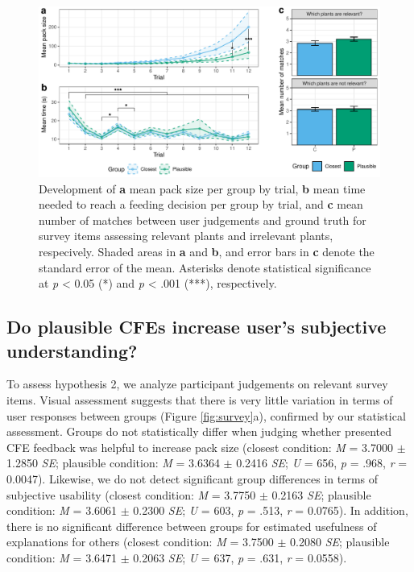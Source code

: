{\begin{figure}
   \centering
   \includegraphics[width=\textwidth]{./media/H1_p_ShubsPerTrial_RTPertrial_PAZ_FINAL.pdf}
   \caption{Development of \textbf{a} mean pack size per group by trial, \textbf{b} mean time needed to reach a feeding decision per group by trial, and \textbf{c} mean number of matches between user judgements and ground truth for survey items assessing relevant plants and irrelevant plants, respecively. Shaded areas in \textbf{a} and \textbf{b}, and error bars in \textbf{c} denote the standard error of the mean. Asterisks denote statistical significance at \textit{p} < 0.05 (*) and \textit{p} < .001 (***), respectively.}
   \label{fig:hyp1}
 \end{figure}

\subsection{Do plausible CFEs increase user's subjective understanding?}
To assess hypothesis 2, we analyze participant judgements on relevant survey items.
Visual assessment suggests that there is very little variation in terms of user responses between groups (Figure \ref{fig:survey}a), confirmed by our statistical assessment. 
Groups do not statistically differ when judging whether presented \gls{CFE} feedback was helpful to increase pack size (closest condition: \textit{M} = 3.7000 $\pm$ 1.2850 \textit{SE}; plausible condition: \textit{M} = 3.6364 $\pm$ 0.2416 \textit{SE}; \textit{U} = 656, \textit{p} = .968, \textit{r} = 0.0047).
Likewise, we do not detect significant group differences in terms of subjective usability (closest condition: \textit{M} = 3.7750 $\pm$ 0.2163 \textit{SE}; plausible condition: \textit{M} = 3.6061 $\pm$ 0.2300 \textit{SE}; \textit{U} = 603, \textit{p} = .513, \textit{r} = 0.0765).
In addition, there is no significant difference between groups for estimated usefulness of explanations for others (closest condition: \textit{M} = 3.7500 $\pm$ 0.2080 \textit{SE}; plausible condition: \textit{M} = 3.6471 $\pm$ 0.2063 \textit{SE}; \textit{U} = 637, \textit{p} = .631, \textit{r} = 0.0558).

}
